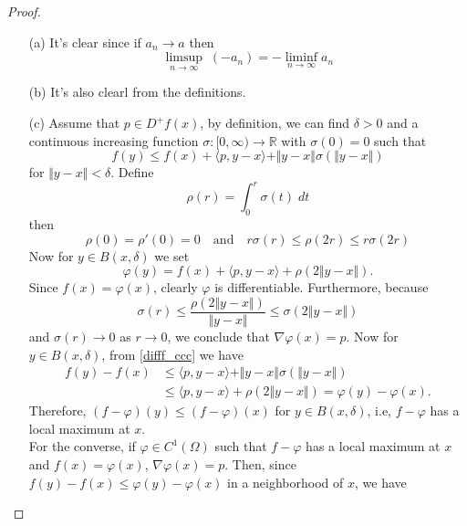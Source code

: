 \documentclass[12pt, oneside]{amsart}  	%
\begin{document}
\begin{proof}\quad
\begin{itemize}
\item[(a)] It's clear since if $a_n \longrightarrow a$ then
\begin{equation*}
\limsup_{n\longrightarrow \infty}\;(-a_n) = -\liminf_{n\longrightarrow \infty} a_n
\end{equation*}
\item[(b)] It's also clearl from the definitions.
\item[(c)] Assume that $p\in D^+f(x)$, by definition, we can find $\delta > 0$ and a continuous increasing function $\sigma:[0,\infty)\longrightarrow \mathbb{R}$ with $\sigma(0) = 0$ such that
\begin{equation}\label{difff_ccc}
f(y) \leq f(x) + \langle p,y-x\rangle + \Vert y-x\Vert \sigma(\Vert y-x\Vert)
\end{equation}
for $\Vert y-x\Vert < \delta$. Define
\begin{equation*}
\rho(r) = \int_{0}^r \sigma(t)\;dt
\end{equation*}
then
\begin{equation*}
 \rho(0) = \rho'(0) = 0 \quad\text{and}\quad r\sigma(r)\leq \rho(2r)\leq r\sigma(2r)
\end{equation*}
Now for $y\in B(x,\delta)$ we set
\begin{equation*}
\varphi(y) = f(x) + \langle p,y-x\rangle + \rho(2\Vert y-x\Vert).
\end{equation*}
Since $f(x) = \varphi(x)$, clearly $\varphi$ is differentiable. Furthermore, because
\begin{equation*}
\sigma(r)\leq\frac{\rho(2\Vert y-x\Vert)}{\Vert y-x\Vert}  \leq \sigma(2\Vert y-x\Vert)
\end{equation*}
and $\sigma(r)\longrightarrow 0$ as $r\longrightarrow 0$, we conclude that $\nabla \varphi(x) = p$. Now for $y\in B(x,\delta)$, from \eqref{difff_ccc} we have
\begin{align*}
f(y) - f(x) &\leq \langle p,y-x\rangle + \Vert y-x\Vert\sigma(\Vert y-x\Vert)\\
 &\leq \langle p,y-x\rangle + \rho(2\Vert y-x\Vert) = \varphi(y) - \varphi(x).
\end{align*}
Therefore, $(f-\varphi)(y) \leq (f-\varphi)(x)$ for $y\in B(x,\delta)$, i.e, $f-\varphi$ has a local maximum at $x$.\\
For the converse, if $\varphi\in C^1(\Omega)$ such that $f-\varphi$ has a local maximum at $x$ and $f(x) = \varphi(x)$, $\nabla \varphi(x) = p$. Then, since $f(y) -f(x) \leq \varphi(y) - \varphi(x)$ in a neighborhood of $x$, we have

\end{itemize}
\end{proof}
\end{document}
